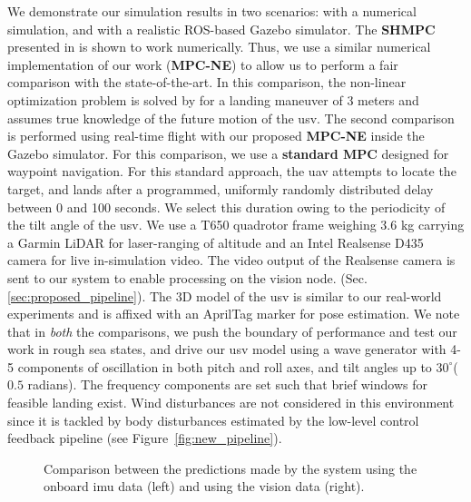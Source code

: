 \documentclass[letterpaper, 10 pt, journal, twoside]{IEEEtran}
\begin{document}
We demonstrate our simulation results in two scenarios: with a numerical simulation, and with a realistic ROS-based Gazebo simulator\cite{baca2021mrs}. The \textbf{SHMPC} presented in \cite{Sultan2020} is shown to work numerically. Thus, we use a similar numerical implementation of our work (\textbf{MPC-NE}) to allow us to perform a fair comparison with the state-of-the-art. In this comparison, the non-linear optimization problem is solved by \cite{NLOPT} for a landing maneuver of 3 meters and assumes true knowledge of the future motion of the \ac{usv}. The second comparison is performed using real-time flight with our proposed \textbf{MPC-NE} inside the Gazebo simulator. For this comparison, we use a \textbf{standard MPC}\cite{baca2021mrs} designed for waypoint navigation. For this standard approach, the \ac{uav} attempts to locate the target, and lands after a programmed, uniformly randomly distributed delay between 0 and 100 seconds. We select this duration owing to the periodicity of the tilt angle of the \ac{usv}. We use a T650 quadrotor frame weighing 3.6 kg carrying a Garmin LiDAR for laser-ranging of altitude and an Intel Realsense D435 camera for live in-simulation video. The video output of the Realsense camera is sent to our system to enable processing on the vision node. (Sec. \ref{sec:proposed_pipeline}). The 3D model of the \ac{usv} is similar to our real-world experiments and is affixed with an AprilTag \cite{krogius2019iros} marker for pose estimation. We note that in \textit{both} the comparisons, we push the boundary of performance and test our work in rough sea states, and drive our \ac{usv} model using a wave generator with 4-5 components of oscillation in both pitch and roll axes, and tilt angles up to $30^\circ$($0.5$ radians). The frequency components are set such that brief windows for feasible landing exist. Wind disturbances are not considered in this environment since it is tackled by body disturbances estimated by the low-level control feedback pipeline (see Figure~\ref{fig:new_pipeline}).
 

\begin{figure}[t]
\centering
{}
\hfil
{}
\caption{Comparison between the predictions made by the system using the onboard \ac{imu} data (left) and using the vision data (right).}
\label{fig:pred_comparison}
\end{figure}
\end{document}
